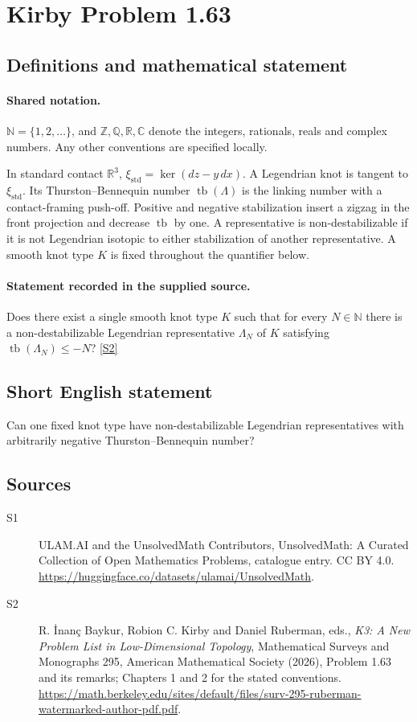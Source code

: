 \documentclass[11pt]{article}
\newcommand{\sref}[2]{\hyperlink{source:#1:#2}{[S#2]}}
\begin{document}
\section{Kirby Problem 1.63}\label{statement}

\subsection{Definitions and mathematical statement}

\paragraph{Shared notation.}$\mathbb N=\{1,2,\ldots\}$, and $\mathbb Z,\mathbb Q,\mathbb R,\mathbb C$ denote the integers, rationals, reals and complex numbers. Any other conventions are specified locally.


In standard contact $\mathbb R^3$, $\xi_{\mathrm{std}}=\ker(dz-y\,dx)$. A Legendrian knot is tangent to $\xi_{\mathrm{std}}$. Its Thurston--Bennequin number $\operatorname{tb}(\Lambda)$ is the linking number with a contact-framing push-off. Positive and negative stabilization insert a zigzag in the front projection and decrease $\operatorname{tb}$ by one. A representative is non-destabilizable if it is not Legendrian isotopic to either stabilization of another representative. A smooth knot type $K$ is fixed throughout the quantifier below.
\paragraph{Statement recorded in the supplied source.}
Does there exist a single smooth knot type $K$ such that for every $N\in\mathbb N$ there is a non-destabilizable Legendrian representative $\Lambda_N$ of $K$ satisfying $\operatorname{tb}(\Lambda_N)\le -N$? \sref{statement}{2}

\subsection{Short English statement}
Can one fixed knot type have non-destabilizable Legendrian representatives with arbitrarily negative Thurston--Bennequin number?
\subsection{Sources}
\begin{description}
\item[\hypertarget{source:statement:1}{S1}] ULAM.AI and the UnsolvedMath Contributors, UnsolvedMath: A Curated Collection of Open Mathematics Problems, catalogue entry. CC BY 4.0. \url{https://huggingface.co/datasets/ulamai/UnsolvedMath}.
\item[\hypertarget{source:statement:2}{S2}] R. İnanç Baykur, Robion C. Kirby and Daniel Ruberman, eds., \emph{K3: A New Problem List in Low-Dimensional Topology}, Mathematical Surveys and Monographs 295, American Mathematical Society (2026), Problem 1.63 and its remarks; Chapters 1 and 2 for the stated conventions. \url{https://math.berkeley.edu/sites/default/files/surv-295-ruberman-watermarked-author-pdf.pdf}.
\end{description}
\label{end:statement}
\end{document}
